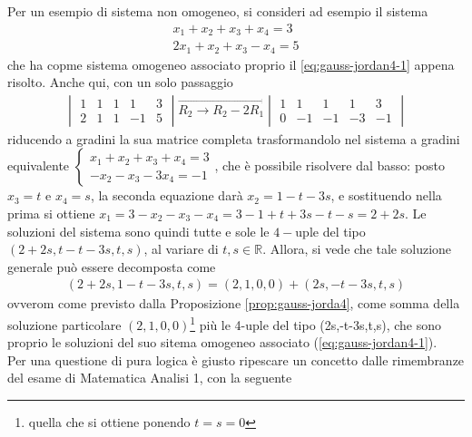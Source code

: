 \documentclass{book}
\theoremstyle{definition}
\theoremstyle{plain}
\begin{document}
Per un esempio di sistema non omogeneo, si consideri ad esempio il sistema
\begin{eqnarray*}
  x_1+x_2+x_3+x_4=3\\
  2x_1+x_2+x_3-x_4=5
\end{eqnarray*}
che ha copme sistema omogeneo associato proprio il \ref{eq:gauss-jordan4-1} appena
risolto. Anche qui, con un solo passaggio
\begin{eqnarray*}
  \begin{vmatrix}
    1 & 1 & 1 & 1 & 3\\
    2 & 1 & 1 & -1 & 5
  \end{vmatrix}\overrightarrow{R_2\to R_2-2R_1}
  \begin{vmatrix}
    1 & 1 & 1 & 1 & 3\\
    0 & -1 & -1 & -3 & -1
  \end{vmatrix}
\end{eqnarray*}
riducendo a gradini la sua matrice completa trasformandolo nel sistema a gradini equivalente
$
\begin{cases}
  x_1+x_2+x_3+x_4=3\\
  -x_2-x_3-3x_4=-1
\end{cases}
$, che è possibile risolvere dal basso: posto $x_3=t$ e $x_4=s$, la seconda equazione darà
$x_2=1-t-3s$, e sostituendo nella prima si ottiene $x_1=3-x_2-x_3-x_4=3-1+t+3s-t-s=2+2s$.
Le soluzioni del sistema sono quindi tutte e sole le $4-$uple del tipo $(2+2s, t-t-3s,t,s)$,
al variare di $t,s\in \mathds{R}$. Allora, si vede che tale soluzione generale può essere
decomposta come
\begin{eqnarray*}
  (2+2s,1-t-3s,t,s)=(2,1,0,0)+(2s,-t-3s,t,s)
\end{eqnarray*}
ovverom come previsto dalla Proposizione \ref{prop:gauss-jorda4}, come somma della soluzione
particolare $(2,1,0,0)$\footnote{quella che si ottiene ponendo $t=s=0$} più le 4-uple del tipo
(2s,-t-3s,t,s), che sono proprio le soluzioni del suo sitema omogeneo associato
(\ref{eq:gauss-jordan4-1}).\\
Per una questione di pura logica è giusto ripescare un concetto dalle rimembranze del esame
di Matematica Analisi 1, con la seguente
\end{document}
